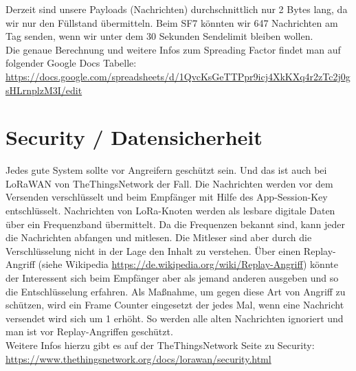 \noindent
Derzeit sind unsere Payloads (Nachrichten) durchschnittlich nur 2 Bytes lang, da wir nur den Füllstand übermitteln. Beim SF7 könnten wir 647 Nachrichten am Tag senden, wenn wir unter dem 30 Sekunden Sendelimit bleiben wollen.\\

\noindent
Die genaue Berechnung und weitere Infos zum Spreading Factor findet man auf folgender Google Docs Tabelle: \url{https://docs.google.com/spreadsheets/d/1QvcKsGeTTPpr9icj4XkKXq4r2zTc2j0gsHLrnplzM3I/edit}

\section{Security / Datensicherheit}
Jedes gute System sollte vor Angreifern geschützt sein. Und das ist auch bei LoRaWAN von TheThingsNetwork der Fall. Die Nachrichten werden vor dem Versenden verschlüsselt und beim Empfänger mit Hilfe des App-Session-Key entschlüsselt. Nachrichten von LoRa-Knoten werden als lesbare digitale Daten über ein Frequenzband übermittelt. Da die Frequenzen bekannt sind, kann jeder die Nachrichten abfangen und mitlesen. Die Mitleser sind aber durch die Verschlüsselung nicht in der Lage den Inhalt zu verstehen. Über einen Replay-Angriff (siehe Wikipedia \url{https://de.wikipedia.org/wiki/Replay-Angriff}) könnte der Interessent sich beim Empfänger aber als jemand anderen ausgeben und so die Entschlüsselung erfahren. Als Maßnahme, um gegen diese Art von Angriff zu schützen, wird ein Frame Counter eingesetzt der jedes Mal, wenn eine Nachricht versendet wird sich um 1 erhöht. So werden alle alten Nachrichten ignoriert und man ist vor Replay-Angriffen geschützt.\\

\noindent
Weitere Infos hierzu gibt es auf der TheThingsNetwork Seite zu Security: \url{https://www.thethingsnetwork.org/docs/lorawan/security.html}\\

